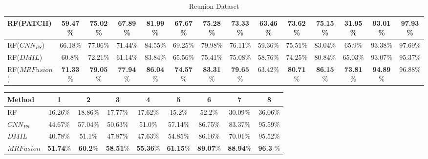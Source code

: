 \documentclass[journal]{IEEEtran}
\newcommand{\method}{$MRFusion$}
\begin{document}
\begin{table*}[!ht]
\begin{tabular}{|l||c|c|c|c|c|c|c|c|c|c|c|c|c|}
RF(PATCH) & 59.47\% & 75.02\% & 67.89\% & 81.99\% & 67.67\% & 75.28\% & 73.33\% & \textbf{63.46}\% & 73.62\% & 75.15\% & 31.95\% & 93.01\% & \textbf{97.93}\% \\ \hline
RF($CNN_{PS}$) & 66.18\% & 77.06\% & 71.44\% & 84.55\% & 69.25\% & 79.98\% & 76.11\% & 59.36\% & 75.51\% & 83.04\% & 65.9\% & 93.38\% & 97.69\% \\ \hline
RF($DMIL$) & 60.8\% & 72.21\% & 61.14\% & 83.84\% & 65.56\% & 75.41\% & 75.08\% & 58.76\% & 74.25\% & 80.84\% & 65.03\% & 93.07\% & 95.37\% \\ \hline
RF(\method) & \textbf{71.33}\% & \textbf{79.05}\% & \textbf{77.94}\% & \textbf{86.04}\% & \textbf{74.57}\% & \textbf{83.31}\% & \textbf{79.65}\% & 63.42\% & \textbf{80.71}\% & \textbf{86.15}\% & \textbf{73.81}\% & \textbf{94.89}\% & 96.88\% \\ \hline
\end{tabular}
\caption{Reunion Dataset\label{tab:PerClass_fm_reunion}}
\end{table*}\begin{table*}[!ht]
\centering
\begin{tabular}{|l||c|c|c|c|c|c|c|c|}
	\hline
\textbf{Method} & 1 & 2 & 3 & 4 & 5 & 6 & 7 & 8 \\   \hline \hline
RF & 16.26\% & 18.86\% & 17.77\% & 17.62\% & 15.2\% & 52.2\% & 30.09\% & 36.06\% \\ \hline
$CNN_{PS}$ & 44.67\% & 57.04\% & 50.63\% & 51.0\% & 57.14\% & 86.75\% & 83.37\% & 95.59\% \\ \hline
$DMIL$ & 40.78\% & 51.1\% & 47.87\% & 47.63\% & 54.85\% & 86.16\% & 70.01\% & 95.52\% \\ \hline
\method & \textbf{51.74}\% & \textbf{60.2}\% & \textbf{58.51}\% & \textbf{55.36}\% & \textbf{61.15}\% & \textbf{89.07}\% & \textbf{88.94}\% & \textbf{96.3} \% \\ \hline
\hline \hline


\end{tabular}
\end{table*}
\end{document}
